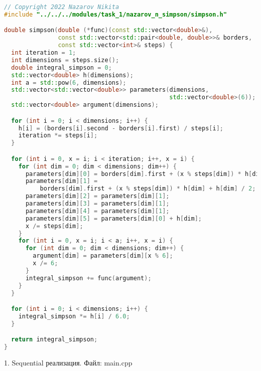 \documentclass{report}
\begin{document}
\begin{lstlisting}[language=C++]
// Copyright 2022 Nazarov Nikita
#include "../../../modules/task_1/nazarov_n_simpson/simpson.h"

double simpson(double (*func)(const std::vector<double>&),
               const std::vector<std::pair<double, double>>& borders,
               const std::vector<int>& steps) {
  int iteration = 1;
  int dimensions = steps.size();
  double integral_simpson = 0;
  std::vector<double> h(dimensions);
  int a = std::pow(6, dimensions);
  std::vector<std::vector<double>> parameters(dimensions,
                                              std::vector<double>(6));
  std::vector<double> argument(dimensions);

  for (int i = 0; i < dimensions; i++) {
    h[i] = (borders[i].second - borders[i].first) / steps[i];
    iteration *= steps[i];
  }

  for (int i = 0, x = i; i < iteration; i++, x = i) {
    for (int dim = 0; dim < dimensions; dim++) {
      parameters[dim][0] = borders[dim].first + (x % steps[dim]) * h[dim];
      parameters[dim][1] =
          borders[dim].first + (x % steps[dim]) * h[dim] + h[dim] / 2;
      parameters[dim][2] = parameters[dim][1];
      parameters[dim][3] = parameters[dim][1];
      parameters[dim][4] = parameters[dim][1];
      parameters[dim][5] = parameters[dim][0] + h[dim];
      x /= steps[dim];
    }
    for (int i = 0, x = i; i < a; i++, x = i) {
      for (int dim = 0; dim < dimensions; dim++) {
        argument[dim] = parameters[dim][x % 6];
        x /= 6;
      }
      integral_simpson += func(argument);
    }
  }

  for (int i = 0; i < dimensions; i++) {
    integral_simpson *= h[i] / 6.0;
  }

  return integral_simpson;
}
\end{lstlisting}

\par 1. Sequential реализация. Файл: main.cpp
\end{document}
